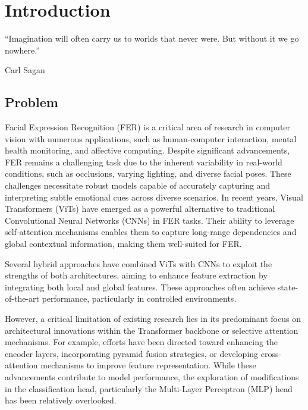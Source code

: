 \chapter{Introduction}
\label{chapter:introduction}


\epigraph{``Imagination will often carry us to worlds that never were. But without it we go nowhere.''}{Carl Sagan}

\newpage


\newpage

\section{Problem}


Facial Expression Recognition (\gls{FER}) is a critical area of research in computer
vision with numerous applications, such as human-computer interaction, mental
health monitoring, and affective computing. Despite significant advancements, \gls{FER}
remains a challenging task due to the inherent variability in real-world conditions,
such as occlusions, varying lighting, and diverse facial poses. These challenges
necessitate robust models capable of accurately capturing and interpreting subtle
emotional cues across diverse scenarios.
In recent years, Visual Transformers (ViTs) have emerged as a powerful alternative
to traditional Convolutional Neural Networks (CNNs) in \gls{FER} tasks. Their ability to leverage self-attention mechanisms enables them to capture long-range dependencies
and global contextual information, making them well-suited for FER.

Several hybrid approaches have combined ViTs with CNNs to exploit the strengths of both architectures, aiming to enhance feature extraction by integrating both local
and global features. These approaches often achieve state-of-the-art performance, particularly in controlled environments.

However, a critical limitation of existing research lies in its predominant focus on architectural innovations within the Transformer backbone or selective attention
mechanisms. For example, efforts have been directed toward enhancing the encoder layers, incorporating pyramid fusion strategies, or developing cross-attention mechanisms to improve feature representation. While these advancements contribute to model performance, the exploration of modifications in the classification head,
particularly the Multi-Layer Perceptron (MLP) head has been relatively overlooked.

